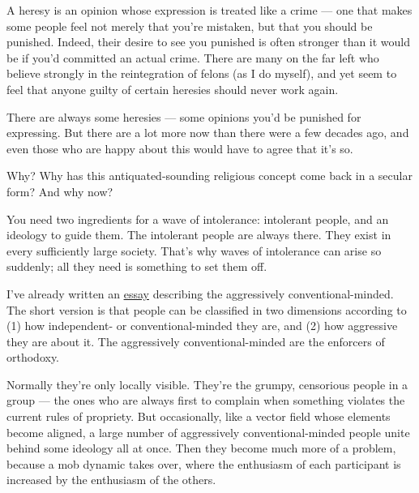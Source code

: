 A heresy is an opinion whose
                  expression is treated like a crime --- one that makes some
                  people feel not merely that you're mistaken, but that you
                  should be punished. Indeed, their desire to see you punished
                  is often stronger than it would be if you'd committed an
                  actual crime. There are many on the far left who believe
                  strongly in the reintegration of felons (as I do myself), and
                  yet seem to feel that anyone guilty of certain heresies should
                  never work again.

There are always some heresies
                  --- some opinions you'd be punished for expressing. But
                  there are a lot more now than there were a few decades ago,
                  and even those who are happy about this would have to agree
                  that it's so.

Why? Why has this antiquated-sounding
                  religious concept come back in a secular form? And why now?

You
                  need two ingredients for a wave of intolerance: intolerant
                  people, and an ideology to guide them. The intolerant people
                  are always there. They exist in every sufficiently large
                  society. That's why waves of intolerance can arise so
                  suddenly; all they need is something to set them off.

I've
                  already written an
                  \href{http://www.paulgraham.com/conformism.html}{\underline{essay}} describing the
                  aggressively conventional-minded. The short version is that
                  people can be classified in two dimensions according to (1)
                  how independent- or conventional-minded they are, and (2) how
                  aggressive they are about it. The aggressively
                  conventional-minded are the enforcers of orthodoxy.

Normally
                  they're only locally visible. They're the grumpy, censorious
                  people in a group --- the ones who are always first to
                  complain when something violates the current rules of
                  propriety. But occasionally, like a vector field whose
                  elements become aligned, a large number of aggressively
                  conventional-minded people unite behind some ideology all at
                  once. Then they become much more of a problem, because a mob
                  dynamic takes over, where the enthusiasm of each participant
                  is increased by the enthusiasm of the others.

